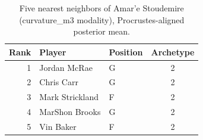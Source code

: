 \begin{table}[htbp]
  \centering\small
  \begin{tabular}{rllc}
    \toprule
    Rank & Player & Position & Archetype \\
    \midrule
    1 & Jordan McRae & G & 2 \\
    2 & Chris Carr & G & 2 \\
    3 & Mark Strickland & F & 2 \\
    4 & MarShon Brooks & G & 2 \\
    5 & Vin Baker & F & 2 \\
    \bottomrule
  \end{tabular}
  \caption{Five nearest neighbors of Amar'e Stoudemire (curvature_m3 modality), Procrustes-aligned posterior mean.}
  \label{tab:Amar_e_Stoudemire_neighbors_curvature_m3}
\end{table}

